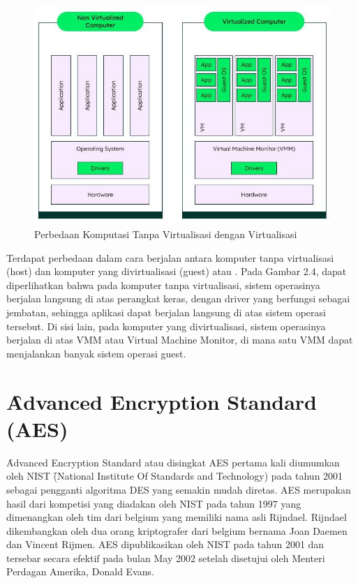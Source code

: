 \begin{figure}
	\centering
	\includegraphics[width=1\textwidth]
	{assets/pics/vm-diagram.jpg}
	\caption{Perbedaan Komputasi Tanpa Virtualisasi dengan Virtualisasi}
	\label{fig:vm-diagram}
\end{figure}

Terdapat perbedaan dalam cara berjalan antara komputer tanpa virtualisasi (host) dan komputer yang divirtualisasi (guest) atau \vm. Pada Gambar 2.4, dapat diperlihatkan bahwa pada komputer tanpa virtualisasi, sistem operasinya berjalan langsung di atas perangkat keras, dengan driver yang berfungsi sebagai jembatan, sehingga aplikasi dapat berjalan langsung di atas sistem operasi tersebut. Di sisi lain, pada komputer yang divirtualisasi, sistem operasinya berjalan di atas VMM atau Virtual Machine Monitor, di mana satu VMM dapat menjalankan banyak sistem operasi guest.

\section{\f{Advanced Encryption Standard} (AES)}
\f{Advanced Encryption Standard} atau disingkat AES pertama kali diumumkan oleh NIST \f{(National Institute Of Standards and Technology)} pada tahun 2001 sebagai pengganti algoritma DES yang semakin mudah diretas. AES merupakan hasil dari kompetisi yang diadakan oleh NIST pada tahun 1997 yang dimenangkan oleh tim dari belgium yang memiliki nama asli Rijndael. Rijndael dikembangkan oleh dua orang kriptografer dari belgium bernama Joan Daemen dan Vincent Rijmen. AES dipublikasikan oleh NIST pada tahun 2001 dan tersebar secara efektif pada bulan May 2002 setelah disetujui oleh Menteri Perdagan Amerika, Donald Evans\cite{Kaffahemailencryptaes}.

